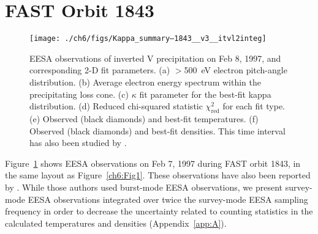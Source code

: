 



  
  \section{FAST Orbit 1843}


  \begin{figure}
    \centering
    \noindent\texttt{[image: ./ch6/figs/Kappa\_summary--1843\_\_v3\_\_itvl2integ]}
    \caption[Inverted V precipitation and best-fit Maxwellian and kappa
    distribution parameters (Orbit 1843)]{EESA observations of inverted V
      precipitation on Feb 8, 1997, and corresponding 2-D fit parameters. (a)
      $>$500~eV electron pitch-angle distribution. (b) Average electron energy spectrum
      within the precipitating loss cone. (c) $\kappa$ fit parameter for the
      best-fit kappa distribution. (d) Reduced chi-squared statistic
      $\chi^2_{\mathrm{red}}$ for each fit type. (e) Observed (black diamonds)
      and best-fit temperatures. (f) Observed (black diamonds) and best-fit
      densities. This time interval has also been studied by
      \citet{Ergun1998a,Ergun1998}.}
    \label{ch6:Fig4}
  \end{figure}


  Figure~\ref{ch6:Fig4} shows EESA observations on Feb 7, 1997 during FAST orbit
  1843, in the same layout as Figure~\ref{ch6:Fig1}. These observations have
  also been reported by \citet{Ergun1998a,Ergun1998}. While those authors used
  burst-mode EESA observations, we present survey-mode EESA observations
  integrated over twice the survey-mode EESA sampling frequency in order
  to decrease the uncertainty related to counting statistics in the calculated
  temperatures and densities (Appendix~\ref{app:A}).

